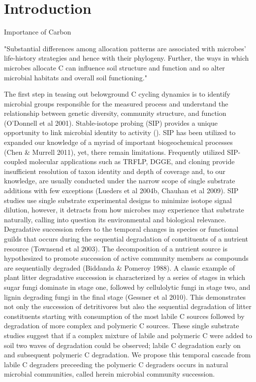 \section{Introduction}

Importance of Carbon 



"Substantial differences among allocation patterns are associated with microbes’ life-history strategies and hence with their phylogeny. Further, the ways in which microbes allocate C can influence soil structure and function and so alter microbial habitats and overall soil functioning." \cite{Schimel_2012}

The first step in teasing out belowground C cycling dynamics is to identify microbial groups responsible for the measured process and understand the relationship between genetic diversity, community structure, and function (O’Donnell et al 2001). Stable-isotope probing (SIP) provides a unique opportunity to link microbial identity to activity (\cite{Chen_Murrell_2010}). SIP has been utilized to expanded our knowledge of a myriad of important biogeochemical processes (Chen & Murrell 2011), yet, there remain limitations. Frequently utilized SIP-coupled molecular applications such as TRFLP, DGGE, and cloning provide insufficient resolution of taxon identity and depth of coverage and, to our knowledge, are usually conducted under the narrow scope of single substrate additions with few exceptions (Lueders et al 2004b, Chauhan et al 2009). SIP studies use single substrate experimental designs to minimize isotope signal dilution, however, it detracts from how microbes may experience that substrate naturally, calling into question its environmental and biological relevance.
Degradative succession refers to the temporal changes in species or functional guilds that occurs during the sequential degradation of constituents of a nutrient resource (Townsend et al 2003).  The decomposition of a nutrient source is hypothesized to promote succession of active community members as compounds are sequentially degraded (Biddanda & Pomeroy 1988).  A classic example of plant litter degradative succession is characterized by a series of stages in which sugar fungi dominate in stage one, followed by cellulolytic fungi in stage two, and lignin degrading fungi in the final stage (Gessner et al 2010).  This demonstrates not only the succession of detritivores but also the sequential degradation of litter constituents starting with consumption of the most labile C sources followed by degradation of more complex and polymeric C sources. These single substrate studies suggest that if a complex mixture of labile and polymeric C were added to soil two waves of degradation could be observed; labile C degradation early on and subsequent polymeric C degradation.  We propose this temporal cascade from labile C degraders preceeding the polymeric C degraders occurs in natural microbial communities, called herein microbial community succession.  
    
